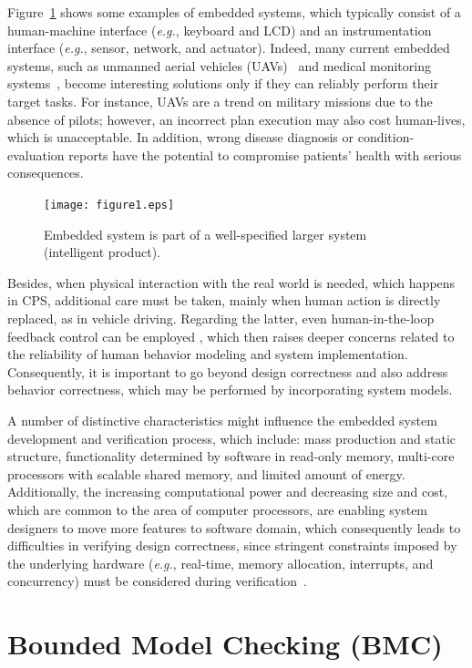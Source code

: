 \documentclass{acm_sen_article}
\begin{document}
Figure~\ref{intelligent-product} shows some examples of embedded systems, which typically consist of a human-machine interface ({\it e.g.}, keyboard and LCD) and an instrumentation interface ({\it e.g.}, sensor, network, and actuator). Indeed, many current embedded systems, such as unmanned aerial vehicles (UAVs)~\cite{groza2015formal} and medical monitoring systems~\cite{Cordeiro09}, become interesting solutions only if they can reliably perform their target tasks. For instance, UAVs are a trend on military missions due to the absence of pilots; however, an incorrect plan execution may also cost human-lives, which is unacceptable. In addition, wrong disease diagnosis or condition-evaluation reports have the potential to compromise patients' health with serious consequences.
%
\begin{figure}[!t]
	\centering
	\texttt{[image: figure1.eps]}
	\caption{Embedded system is part of a well-specified larger system (intelligent product).}
	\label{intelligent-product}
\end{figure}

Besides, when physical interaction with the real world is needed, which happens in CPS, additional care must be taken, mainly when human action is directly replaced, as in vehicle driving. Regarding the latter, even human-in-the-loop feedback control can be employed \cite{munir}, which then raises deeper concerns related to the reliability of human behavior modeling and system implementation. Consequently, it is important to go beyond design correctness and also address behavior correctness, which may be performed by incorporating system models.

A number of distinctive characteristics might influence the embedded system development and verification process, which include: mass production and static structure, functionality determined by software in read-only memory, multi-core processors with scalable shared memory, and limited amount of energy. Additionally, the increasing computational power and decreasing size and cost, which are common to the area of computer processors, are enabling system designers to move more features to software domain, which consequently leads to difficulties in verifying design correctness, since stringent constraints imposed by the underlying hardware ({\it e.g.}, real-time, memory allocation, interrupts, and concurrency) must be considered during verification~\cite{Kroening15}.


\section{Bounded Model Checking (BMC)}
\end{document}
